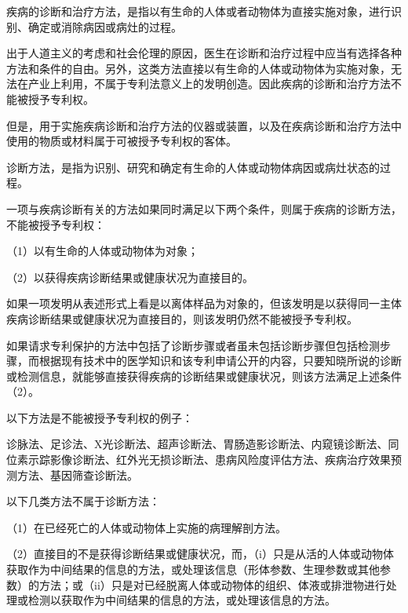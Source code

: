 疾病的诊断和治疗方法，是指以有生命的人体或者动物体为直接实施对象，进行识别、确定或消除病因或病灶的过程。

出于人道主义的考虑和社会伦理的原因，医生在诊断和治疗过程中应当有选择各种方法和条件的自由。另外，这类方法直接以有生命的人体或动物体为实施对象，无法在产业上利用，不属于专利法意义上的发明创造。因此疾病的诊断和治疗方法不能被授予专利权。

但是，用于实施疾病诊断和治疗方法的仪器或装置，以及在疾病诊断和治疗方法中使用的物质或材料属于可被授予专利权的客体。

诊断方法，是指为识别、研究和确定有生命的人体或动物体病因或病灶状态的过程。

一项与疾病诊断有关的方法如果同时满足以下两个条件，则属于疾病的诊断方法，不能被授予专利权：

{\setlength{\parindent}{17.1bp}（1）以有生命的人体或动物体为对象；\par}

{\setlength{\parindent}{17.1bp}（2）以获得疾病诊断结果或健康状况为直接目的。\par}

如果一项发明从表述形式上看是以离体样品为对象的，但该发明是以获得同一主体疾病诊断结果或健康状况为直接目的，则该发明仍然不能被授予专利权。

如果请求专利保护的方法中包括了诊断步骤或者虽未包括诊断步骤但包括检测步骤，而根据现有技术中的医学知识和该专利申请公开的内容，只要知晓所说的诊断或检测信息，就能够直接获得疾病的诊断结果或健康状况，则该方法满足上述条件（2）。

以下方法是不能被授予专利权的例子：

诊脉法、足诊法、X光诊断法、超声诊断法、胃肠造影诊断法、内窥镜诊断法、同位素示踪影像诊断法、红外光无损诊断法、患病风险度评估方法、疾病治疗效果预测方法、基因筛查诊断法。

以下几类方法不属于诊断方法：

{\setlength{\parindent}{17.1bp}（1）在已经死亡的人体或动物体上实施的病理解剖方法。\par}

{\setlength{\parindent}{17.1bp}（2）直接目的不是获得诊断结果或健康状况，而，（i）只是从活的人体或动物体获取作为中间结果的信息的方法，或处理该信息（形体参数、生理参数或其他参数）的方法；或（ii）只是对已经脱离人体或动物体的组织、体液或排泄物进行处理或检测以获取作为中间结果的信息的方法，或处理该信息的方法。\par}

